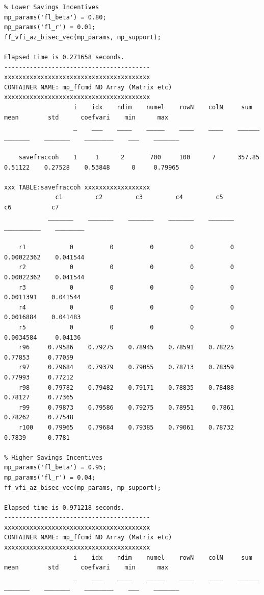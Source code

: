 \documentclass[
]{book}
\begin{document}
\begin{verbatim}
% Lower Savings Incentives
mp_params('fl_beta') = 0.80;
mp_params('fl_r') = 0.01;
ff_vfi_az_bisec_vec(mp_params, mp_support);

Elapsed time is 0.271658 seconds.
----------------------------------------
xxxxxxxxxxxxxxxxxxxxxxxxxxxxxxxxxxxxxxxx
CONTAINER NAME: mp_ffcmd ND Array (Matrix etc)
xxxxxxxxxxxxxxxxxxxxxxxxxxxxxxxxxxxxxxxx
                   i    idx    ndim    numel    rowN    colN     sum       mean        std      coefvari    min      max  
                   _    ___    ____    _____    ____    ____    ______    _______    _______    ________    ___    _______

    savefraccoh    1     1      2       700     100      7      357.85    0.51122    0.27528    0.53848      0     0.79965

xxx TABLE:savefraccoh xxxxxxxxxxxxxxxxxx
              c1         c2         c3         c4         c5           c6           c7   
            _______    _______    _______    _______    _______    __________    ________

    r1            0          0          0          0          0    0.00022362    0.041544
    r2            0          0          0          0          0    0.00022362    0.041544
    r3            0          0          0          0          0     0.0011391    0.041544
    r4            0          0          0          0          0     0.0016884    0.041483
    r5            0          0          0          0          0     0.0034584     0.04136
    r96     0.79586    0.79275    0.78945    0.78591    0.78225       0.77853     0.77059
    r97     0.79684    0.79379    0.79055    0.78713    0.78359       0.77993     0.77212
    r98     0.79782    0.79482    0.79171    0.78835    0.78488       0.78127     0.77365
    r99     0.79873    0.79586    0.79275    0.78951     0.7861       0.78262     0.77548
    r100    0.79965    0.79684    0.79385    0.79061    0.78732        0.7839      0.7781

% Higher Savings Incentives
mp_params('fl_beta') = 0.95;
mp_params('fl_r') = 0.04;
ff_vfi_az_bisec_vec(mp_params, mp_support);

Elapsed time is 0.971218 seconds.
----------------------------------------
xxxxxxxxxxxxxxxxxxxxxxxxxxxxxxxxxxxxxxxx
CONTAINER NAME: mp_ffcmd ND Array (Matrix etc)
xxxxxxxxxxxxxxxxxxxxxxxxxxxxxxxxxxxxxxxx
                   i    idx    ndim    numel    rowN    colN     sum       mean        std      coefvari    min      max  
                   _    ___    ____    _____    ____    ____    ______    _______    _______    ________    ___    _______


\end{verbatim}
\end{document}
